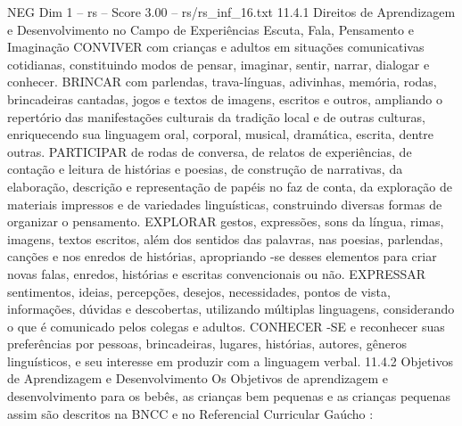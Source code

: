 \begin{textsample}{NEG Dim 1 – rs – Score 3.00 – rs/rs\_inf\_16.txt}  \label{ex:f1_neg_087}
11.4.1 Direitos de Aprendizagem e Desenvolvimento no Campo de Experiências Escuta, Fala, Pensamento e Imaginação CONVIVER com crianças e adultos em situações comunicativas cotidianas, constituindo modos de pensar, imaginar, sentir, narrar, dialogar e conhecer.
BRINCAR com parlendas, trava-línguas, adivinhas, memória, rodas, brincadeiras cantadas, jogos e textos de imagens, escritos e outros, ampliando o repertório das manifestações culturais da tradição local e de outras culturas, enriquecendo sua linguagem oral, corporal, musical, dramática, escrita, dentre outras.
PARTICIPAR de rodas de conversa, de relatos de experiências, de contação e leitura de histórias e poesias, de construção de narrativas, da elaboração, descrição e representação de papéis no faz de conta, da exploração de materiais impressos e de variedades linguísticas, construindo diversas formas de organizar o pensamento.
EXPLORAR gestos, expressões, sons da língua, rimas, imagens, textos escritos, além dos sentidos das palavras, nas poesias, parlendas, canções e nos enredos de histórias, apropriando -se desses elementos para criar novas falas, enredos, histórias e escritas convencionais ou não.
EXPRESSAR sentimentos, ideias, percepções, desejos, necessidades, pontos de vista, informações, dúvidas e descobertas, utilizando múltiplas linguagens, considerando o que é comunicado pelos colegas e adultos.
CONHECER -SE e reconhecer suas preferências por pessoas, brincadeiras, lugares, histórias, autores, gêneros linguísticos, e seu interesse em produzir com a linguagem verbal. 11.4.2 Objetivos de Aprendizagem e Desenvolvimento Os Objetivos de aprendizagem e desenvolvimento para os bebês, as crianças bem pequenas e as crianças pequenas assim são descritos na BNCC e no Referencial Curricular Gaúcho :

\end{textsample}
